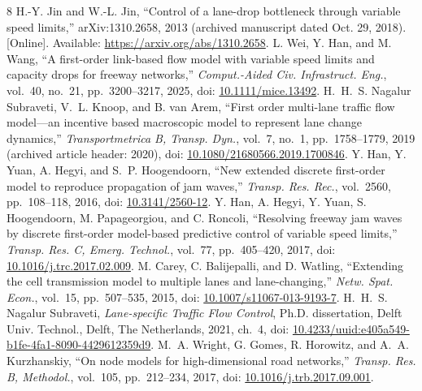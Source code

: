 \documentclass[10pt,a4paper]{article}
\newcommand{\Jin}[1]{\textcolor{SrcJin}{#1}}
\newcommand{\Wei}[1]{\textcolor{SrcWei}{#1}}
\newcommand{\NS}[1]{\textcolor{SrcNS}{#1}}
\newcommand{\Hsix}[1]{\textcolor{SrcHan16}{#1}}
\newcommand{\Hseven}[1]{\textcolor{SrcHan17}{#1}}
\newcommand{\Carey}[1]{\textcolor{SrcCarey}{#1}}
\newcommand{\Thesis}[1]{\textcolor{SrcThesis}{#1}}
\newcommand{\Wright}[1]{\textcolor{SrcWright}{#1}}
\newcommand{\head}[1]{\par\vspace{5pt}\noindent\textbf{#1}\par\nobreak\vspace{1pt}}
\begin{document}
\par\pdfsavepos
{}
\clearpage
\makeatletter
\renewcommand{\section}{\@ifstar{\head}{\head}}
\renewcommand{\@biblabel}[1]{\ifcase#1\or\Jin{[#1]}\or\Wei{[#1]}\or\NS{[#1]}\or\Hsix{[#1]}\or\Hseven{[#1]}\or\Carey{[#1]}\or\Thesis{[#1]}\or\Wright{[#1]}\else[#1]\fi}
\makeatother
\begin{thebibliography}{8}
\setlength{\itemsep}{4pt}\setlength{\parskip}{0pt}
 \Jin{H.-Y. Jin and W.-L. Jin, ``Control of a lane-drop bottleneck
through variable speed limits,'' arXiv:1310.2658, 2013 (archived manuscript
dated Oct. 29, 2018). [Online]. Available:
\url{https://arxiv.org/abs/1310.2658}.}
 \Wei{L. Wei, Y. Han, and M. Wang, ``A first-order link-based flow
model with variable speed limits and capacity drops for freeway networks,''
\emph{Comput.-Aided Civ. Infrastruct. Eng.}, vol.~40, no.~21,
pp.~3200--3217, 2025, doi:
\href{https://doi.org/10.1111/mice.13492}{10.1111/mice.13492}.}
 \NS{H.~H.~S. Nagalur Subraveti, V.~L. Knoop, and B. van Arem,
``First order multi-lane traffic flow model---an incentive based macroscopic
model to represent lane change dynamics,'' \emph{Transportmetrica B, Transp.
Dyn.}, vol.~7, no.~1, pp.~1758--1779, 2019 (archived article header: 2020),
doi: \href{https://doi.org/10.1080/21680566.2019.1700846}{10.1080/21680566.2019.1700846}.}
 \Hsix{Y. Han, Y. Yuan, A. Hegyi, and S.~P. Hoogendoorn,
``New extended discrete first-order model to reproduce propagation of jam
waves,'' \emph{Transp. Res. Rec.}, vol.~2560, pp.~108--118, 2016, doi:
\href{https://doi.org/10.3141/2560-12}{10.3141/2560-12}.}
 \Hseven{Y. Han, A. Hegyi, Y. Yuan, S. Hoogendoorn,
M. Papageorgiou, and C. Roncoli, ``Resolving freeway jam waves by discrete
first-order model-based predictive control of variable speed limits,''
\emph{Transp. Res. C, Emerg. Technol.}, vol.~77, pp.~405--420, 2017, doi:
\href{https://doi.org/10.1016/j.trc.2017.02.009}{10.1016/j.trc.2017.02.009}.}
 \Carey{M. Carey, C. Balijepalli, and D. Watling, ``Extending the
cell transmission model to multiple lanes and lane-changing,''
\emph{Netw. Spat. Econ.}, vol.~15, pp.~507--535, 2015, doi:
\href{https://doi.org/10.1007/s11067-013-9193-7}{10.1007/s11067-013-9193-7}.}
 \Thesis{H.~H.~S. Nagalur Subraveti, \emph{Lane-specific Traffic
Flow Control}, Ph.D. dissertation, Delft Univ. Technol., Delft, The
Netherlands, 2021, ch.~4, doi:
\href{https://doi.org/10.4233/uuid:e405a549-b1fe-4fa1-8090-4429612359d9}{10.4233/uuid:e405a549-b1fe-4fa1-8090-4429612359d9}.}
 \Wright{M.~A. Wright, G. Gomes, R. Horowitz, and
A.~A. Kurzhanskiy, ``On node models for high-dimensional road networks,''
\emph{Transp. Res. B, Methodol.}, vol.~105, pp.~212--234, 2017, doi:
\href{https://doi.org/10.1016/j.trb.2017.09.001}{10.1016/j.trb.2017.09.001}.}
\end{thebibliography}
\end{document}
